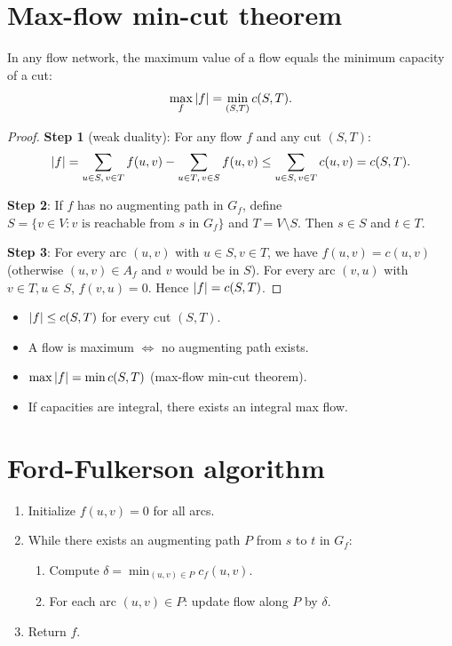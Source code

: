 \section{Max-flow min-cut theorem}

\begin{theorem}
\label{thm:maxflow_mincut}
In any flow network, the maximum value of a flow equals the minimum capacity
of a cut:
\[
  \max_f \left| f \right| = \min_{(S,T)} c(S, T).
\]
\end{theorem}

\begin{proof}
\textbf{Step 1} (weak duality): For any flow $f$ and any cut $(S, T)$:
\[
  \left| f \right| = \sum_{\substack{u \in S,\, v \in T}} f(u,v)
          - \sum_{\substack{u \in T,\, v \in S}} f(u,v)
          \leq \sum_{\substack{u \in S,\, v \in T}} c(u,v) = c(S, T).
\]

\textbf{Step 2}: If $f$ has no augmenting path in $G_f$, define
$S = \{v \in V : v \text{ is reachable from } s \text{ in } G_f\}$ and
$T = V \setminus S$. Then $s \in S$ and $t \in T$.

\textbf{Step 3}: For every arc $(u,v)$ with $u \in S, v \in T$, we have
$f(u,v) = c(u,v)$ (otherwise $(u,v) \in A_f$ and $v$ would be in $S$).
For every arc $(v,u)$ with $v \in T, u \in S$, $f(v,u) = 0$. Hence
$\left| f \right| = c(S, T)$.
\end{proof}

\begin{keyformulas}[title=\textbf{Key flow properties}]
\begin{itemize}
  \item $\left| f \right| \leq c(S,T)$ for every cut $(S,T)$.
  \item A flow is maximum $\iff$ no augmenting path exists.
  \item $\max \left| f \right| = \min c(S,T)$ (max-flow min-cut theorem).
  \item If capacities are integral, there exists an integral max flow.
\end{itemize}
\end{keyformulas}

\section{Ford-Fulkerson algorithm}

\begin{algorithme}[title=\textbf{Ford-Fulkerson}]
\begin{enumerate}
  \item Initialize $f(u,v) = 0$ for all arcs.
  \item While there exists an augmenting path $P$ from $s$ to $t$ in $G_f$:
    \begin{enumerate}
      \item Compute $\delta = \min_{(u,v) \in P} c_f(u,v)$.
      \item For each arc $(u,v) \in P$: update flow along $P$ by $\delta$.
    \end{enumerate}
  \item Return $f$.
\end{enumerate}
\end{algorithme}

